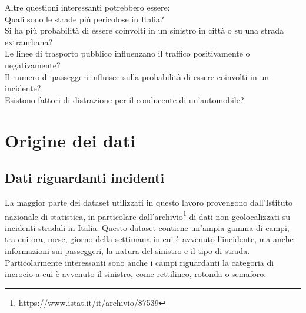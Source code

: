 \documentclass[a4paper,12pt]{report}
\begin{document}
Altre questioni interessanti potrebbero essere:\\
Quali sono le strade più pericolose in Italia?\\
Si ha più probabilità di essere coinvolti in un sinistro in città o 
su una strada extraurbana?\\
Le linee di trasporto pubblico influenzano il traffico positivamente o negativamente?\\
Il numero di passeggeri influisce sulla probabilità di essere coinvolti in un 
incidente?\\
Esistono fattori di distrazione per il conducente di un'automobile? 

\chapter{Origine dei dati}

\section{Dati riguardanti incidenti}

La maggior parte dei dataset utilizzati in questo lavoro 
provengono dall'Istituto nazionale di statistica, in particolare 
dall'archivio\footnote{\url{https://www.istat.it/it/archivio/87539}}
di dati non geolocalizzati su incidenti stradali in Italia.
Questo dataset contiene un'ampia gamma di campi, tra cui ora, 
mese, giorno della settimana in cui è avvenuto l'incidente, 
ma anche informazioni sui passeggeri, la natura del sinistro e il tipo di strada. 
Particolarmente interessanti sono anche i campi riguardanti la categoria di incrocio 
a cui è avvenuto il sinistro, come rettilineo, rotonda o semaforo.
\end{document}
